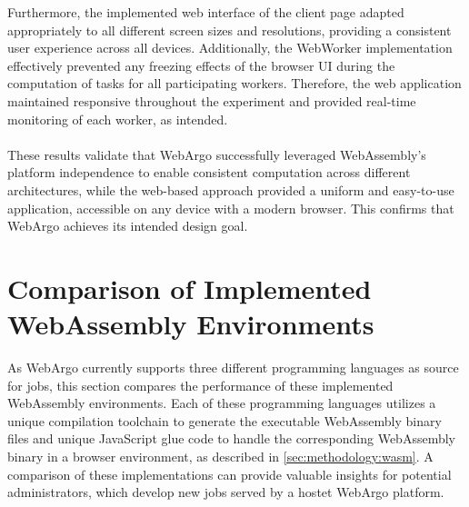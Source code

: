 Furthermore, the implemented web interface of the client page adapted appropriately to all different screen sizes and resolutions, providing a consistent user experience across all devices. Additionally, the WebWorker implementation effectively prevented any freezing effects of the browser \ac{UI} during the computation of tasks for all participating workers. Therefore, the web application maintained responsive throughout the experiment and provided real-time monitoring of each worker, as intended.
\\~\\
These results validate that WebArgo successfully leveraged WebAssembly's platform independence to enable consistent computation across different architectures, while the web-based approach provided a uniform and easy-to-use application, accessible on any device with a modern browser. This confirms that WebArgo achieves its intended design goal.

\section{Comparison of Implemented WebAssembly Environments}
\label{sec:evaluation:languages}
As WebArgo currently supports three different programming languages as source for jobs, this section compares the performance of these implemented WebAssembly environments. Each of these programming languages utilizes a unique compilation toolchain to generate the executable WebAssembly binary files and unique JavaScript glue code to handle the corresponding WebAssembly binary in a browser environment, as described in \autoref{sec:methodology:wasm}. A comparison of these implementations can provide valuable insights for potential administrators, which develop new jobs served by a hostet WebArgo platform.

